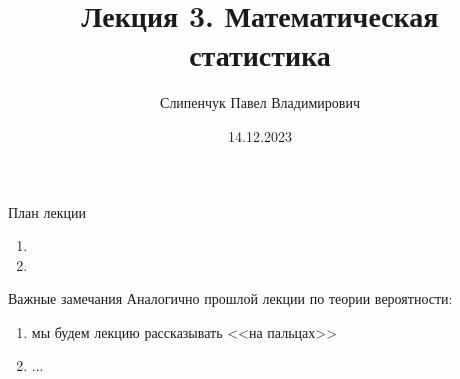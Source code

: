 
  

\title{Лекция 3. Математическая статистика}
\date{14.12.2023}
\author{Слипенчук Павел Владимирович}



  \maketitle
    
\begin{frame}{План лекции}\label{frame:plan}
    \begin{enumerate}
    
    
    \item {}
    \item {}
	


	\end{enumerate}
 \end{frame}

\begin{frame}{Важные замечания}
Аналогично прошлой лекции по теории вероятности:
\begin{enumerate}
	\item мы будем лекцию рассказывать <<на пальцах>>
	\item ...
\end{enumerate}
\end{frame}


